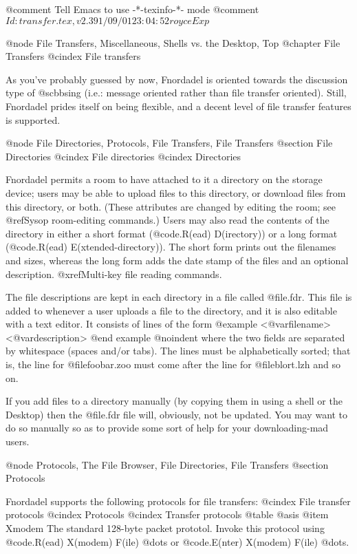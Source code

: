 @comment Tell Emacs to use -*-texinfo-*- mode
@comment $Id: transfer.tex,v 2.3 91/09/01 23:04:52 royce Exp $

@node File Transfers, Miscellaneous, Shells vs. the Desktop, Top
@chapter File Transfers
@cindex File transfers

As you've probably guessed by now, Fnordadel is oriented
towards the discussion type of @sc{bbs}ing (i.e.: message oriented rather than
file transfer oriented).  Still, Fnordadel prides itself on being
flexible, and a decent level of file transfer features is supported.

@node File Directories, Protocols, File Transfers, File Transfers
@section File Directories
@cindex File directories
@cindex Directories

Fnordadel permits a room to have attached to it a directory on the storage
device; users may be able to upload files to this directory, or download
files from this directory, or both.  (These attributes are changed by editing
the room; see @ref{Sysop room-editing commands}.)  Users may also read the
contents of the directory in either a short format (@code{.R(ead) D(irectory)})
or a long format (@code{.R(ead) E(xtended-directory)}).  The short form
prints out the filenames and sizes, whereas the long form adds the date stamp
of the files and an optional description.
@xref{Multi-key file reading commands}.

The file descriptions are kept in each directory in a
file called @file{.fdr}.  This file is added to whenever a user uploads a
file to the directory, and it is also editable with a text editor.
It consists of lines of the form
@example
<@var{filename}> <@var{description}>
@end example
@noindent
where the two fields are separated by whitespace (spaces and/or tabs).
The lines must be alphabetically sorted; that is, the line for
@file{foobar.zoo} must come after the line for @file{blort.lzh} and so on.

If you add files to a directory manually (by copying
them in using a shell or the Desktop) then the @file{.fdr} file will,
obviously, not be updated.  You may want to do so manually so
as to provide some sort of help for your downloading-mad users.

@node Protocols, The File Browser, File Directories, File Transfers
@section Protocols

Fnordadel supports the following protocols for file
transfers:
@cindex File transfer protocols
@cindex Protocols
@cindex Transfer protocols
@table @asis
@item Xmodem
The standard 128-byte packet prototol.  Invoke
this protocol using @code{.R(ead) X(modem) F(ile) @dots{}}
or @code{.E(nter) X(modem) F(ile) @dots{}}.

